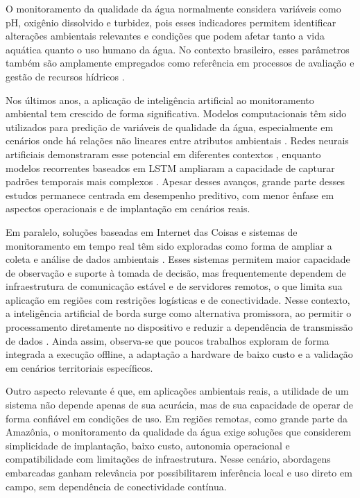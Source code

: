 
O monitoramento da qualidade da \'agua normalmente considera vari\'aveis como pH, oxig\^enio dissolvido e turbidez, pois esses indicadores permitem identificar altera\c{c}\~oes ambientais relevantes e condi\c{c}\~oes que podem afetar tanto a vida aqu\'atica quanto o uso humano da \'agua. No contexto brasileiro, esses par\^ametros tamb\'em s\~ao amplamente empregados como refer\^encia em processos de avalia\c{c}\~ao e gest\~ao de recursos h\'idricos \cite{conama3572005}.

Nos \'ultimos anos, a aplica\c{c}\~ao de intelig\^encia artificial ao monitoramento ambiental tem crescido de forma significativa. Modelos computacionais t\^em sido utilizados para predi\c{c}\~ao de vari\'aveis de qualidade da \'agua, especialmente em cen\'arios onde h\'a rela\c{c}\~oes n\~ao lineares entre atributos ambientais \cite{ahmed2019,aladhaileh2021,yan2024}. Redes neurais artificiais demonstraram esse potencial em diferentes contextos \cite{palani2008}, enquanto modelos recorrentes baseados em LSTM ampliaram a capacidade de capturar padr\~oes temporais mais complexos \cite{liu2019}. Apesar desses avan\c{c}os, grande parte desses estudos permanece centrada em desempenho preditivo, com menor \^enfase em aspectos operacionais e de implanta\c{c}\~ao em cen\'arios reais.

Em paralelo, solu\c{c}\~oes baseadas em Internet das Coisas e sistemas de monitoramento em tempo real t\^em sido exploradas como forma de ampliar a coleta e an\'alise de dados ambientais \cite{zulkifli2022,rosero2020}. Esses sistemas permitem maior capacidade de observa\c{c}\~ao e suporte \`a tomada de decis\~ao, mas frequentemente dependem de infraestrutura de comunica\c{c}\~ao est\'avel e de servidores remotos, o que limita sua aplica\c{c}\~ao em regi\~oes com restri\c{c}\~oes log\'isticas e de conectividade. Nesse contexto, a intelig\^encia artificial de borda surge como alternativa promissora, ao permitir o processamento diretamente no dispositivo e reduzir a depend\^encia de transmiss\~ao de dados \cite{aral2024}. Ainda assim, observa-se que poucos trabalhos exploram de forma integrada a execu\c{c}\~ao offline, a adapta\c{c}\~ao a hardware de baixo custo e a valida\c{c}\~ao em cen\'arios territoriais espec\'ificos.

Outro aspecto relevante \'e que, em aplica\c{c}\~oes ambientais reais, a utilidade de um sistema n\~ao depende apenas de sua acur\'acia, mas de sua capacidade de operar de forma confi\'avel em condi\c{c}\~oes de uso. Em regi\~oes remotas, como grande parte da Amaz\^onia, o monitoramento da qualidade da \'agua exige solu\c{c}\~oes que considerem simplicidade de implanta\c{c}\~ao, baixo custo, autonomia operacional e compatibilidade com limita\c{c}\~oes de infraestrutura. Nesse cen\'ario, abordagens embarcadas ganham relev\^ancia por possibilitarem infer\^encia local e uso direto em campo, sem depend\^encia de conectividade cont\'inua.

